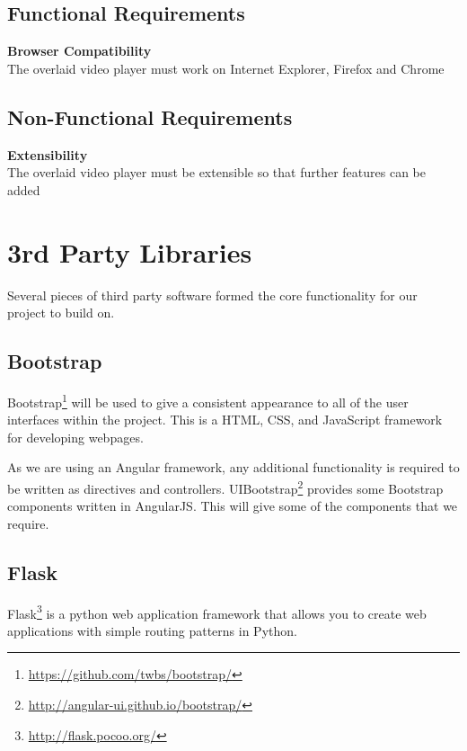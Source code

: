 \subsection{Functional Requirements}
\begin{requirement}[%
 label=\textbf{F\arabic*}]
\item \textbf{Browser Compatibility}  \hfill \\ The overlaid video player must work on Internet Explorer, Firefox and Chrome \label{Req:Browser Compatibility}
\end{requirement}

\subsection{Non-Functional Requirements}
\begin{requirement}[%
 label=\textbf{N\arabic*}]
\item \textbf{Extensibility}  \hfill \\ The overlaid video player must be extensible so that further features can be added \label{Req:Extensibility} %
\end{requirement}
 

\section{3rd Party Libraries}
Several pieces of third party software formed the core functionality for our project to build on. 

\subsection{Bootstrap}
\label{Section:Bootstrap}
Bootstrap\footnote{\url{https://github.com/twbs/bootstrap/}} will be used to give a consistent appearance to all of the user interfaces within the project. This is a HTML, \gls{CSS}, and JavaScript framework for developing webpages.

As we are using an Angular framework, any additional functionality is required to be written as directives and controllers. UIBootstrap\footnote{\url{http://angular-ui.github.io/bootstrap/}} provides some Bootstrap components written in \gls{AngularJS}. This will give some of the components that we require.

\subsection{Flask}
\label{Section:Flask}
Flask\footnote{\url{http://flask.pocoo.org/}} is a python web application framework that allows you to create web applications with simple routing patterns in Python.

